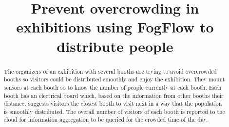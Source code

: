 \documentclass[conference]{ieeeconf}
\title{\LARGE \bf
Prevent overcrowding in exhibitions using FogFlow to distribute people}
\author{\IEEEauthorblockN{Lorenzo Siega Battel}
\IEEEauthorblockA{Politecnico di Milano}
\IEEEauthorblockA{lorenzo.siega@mail.polimi.it}}
\begin{document}
\maketitle
\thispagestyle{empty}
\pagestyle{empty}

\begin{abstract}

The organizers of an exhibition with several booths are trying to avoid overcrowded booths so visitors could be distributed smoothly and enjoy the exhibition. They mount sensors at each booth so to know the number of people currently at each booth. Each booth has an electrical board which, based on the information from other booths their distance, suggests visitors the closest booth to visit next in a way that the population is smoothly distributed. The overall number of visitors of each booth is reported to the cloud for information aggregation to be queried for the crowded time of the day.

\end{abstract}
\end{document}
